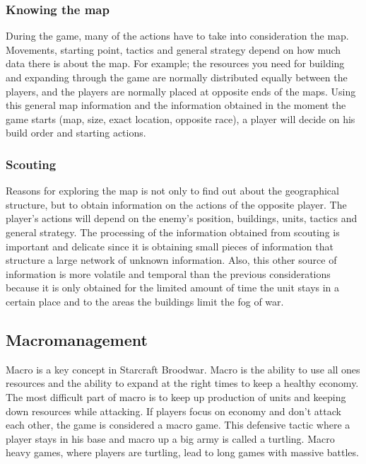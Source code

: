 			\subsubsection{Knowing the map}
				During the game, many of the actions have to take into consideration the map. Movements, starting point, 
				tactics and general strategy depend on how much data there is about the map. 				
				For example; the resources you need for building and expanding through the game are normally distributed
				equally between the players, and the players are normally placed at opposite ends of the maps. 
				Using this general map information and the information obtained in the moment the game starts 
				(map, size, exact location, opposite race), a player will decide on his build order and starting actions. 
		
			\subsubsection{Scouting}
				Reasons for exploring the map is not only to find out about the geographical structure, 
				but to obtain information on the actions of the opposite player. The player's actions will depend on
				the enemy's position, buildings, units, tactics and general strategy. The processing of the information 
				obtained from scouting is important and delicate since it is obtaining small pieces of information 
				that structure a large network of unknown information. Also, this other source of information 
				is more volatile and temporal than the previous considerations because it is only obtained for the 
				limited amount of time the unit stays in a certain place and to the areas the buildings limit the fog of war.
				
	\subsection{Macromanagement}
		Macro is a key concept in Starcraft Broodwar. 
		Macro is the ability to use all ones resources and the ability to expand at the right times to keep a healthy economy.
		The most difficult part of macro is to keep up production of units and keeping down resources while attacking.
		If players focus on economy and don't attack each other, the game is considered a macro game. This defensive tactic where a
		player stays in his base and macro up a big army is called a turtling. Macro heavy games, where players are turtling, lead to
		long games with massive battles. 
			
